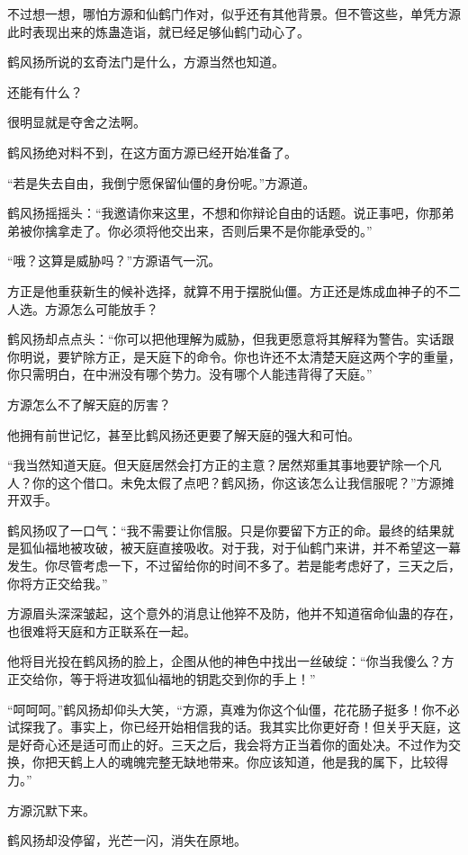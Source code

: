 \begin{this_body}
不过想一想，哪怕方源和仙鹤门作对，似乎还有其他背景。但不管这些，单凭方源此时表现出来的炼蛊造诣，就已经足够仙鹤门动心了。

鹤风扬所说的玄奇法门是什么，方源当然也知道。

还能有什么？

很明显就是夺舍之法啊。

鹤风扬绝对料不到，在这方面方源已经开始准备了。

“若是失去自由，我倒宁愿保留仙僵的身份呢。”方源道。

鹤风扬摇摇头：“我邀请你来这里，不想和你辩论自由的话题。说正事吧，你那弟弟被你擒拿走了。你必须将他交出来，否则后果不是你能承受的。”

“哦？这算是威胁吗？”方源语气一沉。

方正是他重获新生的候补选择，就算不用于摆脱仙僵。方正还是炼成血神子的不二人选。方源怎么可能放手？

鹤风扬却点点头：“你可以把他理解为威胁，但我更愿意将其解释为警告。实话跟你明说，要铲除方正，是天庭下的命令。你也许还不太清楚天庭这两个字的重量，你只需明白，在中洲没有哪个势力。没有哪个人能违背得了天庭。”

方源怎么不了解天庭的厉害？

他拥有前世记忆，甚至比鹤风扬还更要了解天庭的强大和可怕。

“我当然知道天庭。但天庭居然会打方正的主意？居然郑重其事地要铲除一个凡人？你的这个借口。未免太假了点吧？鹤风扬，你这该怎么让我信服呢？”方源摊开双手。

鹤风扬叹了一口气：“我不需要让你信服。只是你要留下方正的命。最终的结果就是狐仙福地被攻破，被天庭直接吸收。对于我，对于仙鹤门来讲，并不希望这一幕发生。你尽管考虑一下，不过留给你的时间不多了。若是能考虑好了，三天之后，你将方正交给我。”

方源眉头深深皱起，这个意外的消息让他猝不及防，他并不知道宿命仙蛊的存在，也很难将天庭和方正联系在一起。

他将目光投在鹤风扬的脸上，企图从他的神色中找出一丝破绽：“你当我傻么？方正交给你，等于将进攻狐仙福地的钥匙交到你的手上！”

“呵呵呵。”鹤风扬却仰头大笑，“方源，真难为你这个仙僵，花花肠子挺多！你不必试探我了。事实上，你已经开始相信我的话。我其实比你更好奇！但关乎天庭，这是好奇心还是适可而止的好。三天之后，我会将方正当着你的面处决。不过作为交换，你把天鹤上人的魂魄完整无缺地带来。你应该知道，他是我的属下，比较得力。”

方源沉默下来。

鹤风扬却没停留，光芒一闪，消失在原地。


\end{this_body}
